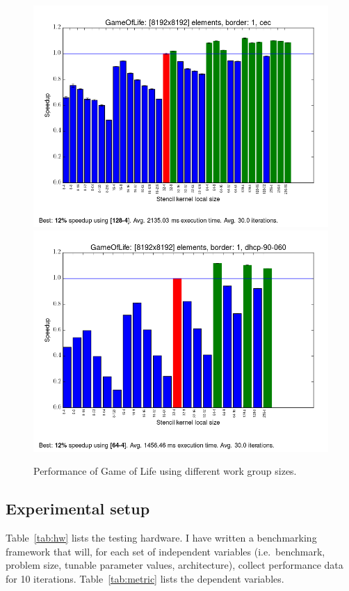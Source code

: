 \begin{figure}[h]
\includegraphics[width=\textwidth]{../../benchmarks/results/e4/GameOfLife-00008192-01-cec.png}
\includegraphics[width=\textwidth]{../../benchmarks/results/e4/GameOfLife-00008192-01-dhcp-90-060.png}
\caption{Performance of Game of Life using different work group
  sizes.}
\label{fig:gol}
\end{figure}

\subsection{Experimental setup}

Table~\ref{tab:hw} lists the testing hardware. I have written a
benchmarking framework that will, for each set of independent
variables (i.e.\ benchmark, problem size, tunable parameter values,
architecture), collect performance data for 10
iterations. Table~\ref{tab:metric} lists the dependent variables.

